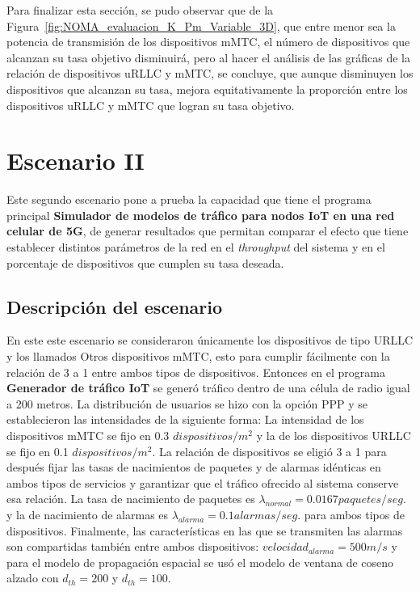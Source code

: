 Para finalizar esta sección, se pudo observar que de la Figura~\ref{fig:NOMA_evaluacion_K_Pm_Variable_3D}, que entre menor sea la potencia de transmisión de los dispositivos mMTC, el número de dispositivos que alcanzan su tasa objetivo disminuirá, pero al hacer el análisis de las gráficas de la relación de dispositivos uRLLC y mMTC, se concluye, que aunque disminuyen los dispositivos que alcanzan su tasa, mejora equitativamente la proporción entre los dispositivos uRLLC y mMTC que logran su tasa objetivo.

\break

\section{Escenario II} %

Este segundo escenario pone a prueba la capacidad que tiene el programa principal \textbf{Simulador de modelos de tráfico para nodos IoT en una red celular de 5G}, de generar resultados que permitan comparar el efecto que tiene establecer distintos parámetros de la red en el \textit{throughput} del sistema y en el porcentaje de dispositivos que cumplen su tasa deseada. \newline

\subsection{Descripción del escenario}

En este este escenario se consideraron únicamente los dispositivos de tipo URLLC y los llamados Otros dispositivos mMTC, esto para cumplir fácilmente con la relación de 3 a 1 entre ambos tipos de dispositivos. Entonces en el programa \textbf{Generador de tráfico IoT} se generó tráfico dentro de una célula de radio igual a 200 metros. La distribución de usuarios se hizo con la opción PPP y se establecieron las intensidades de la siguiente forma: La intensidad de los dispositivos mMTC se fijo en 0.3 $dispositivos/m^2$ y la de los dispositivos URLLC se fijo en 0.1 $dispositivos/m^2$. La relación de dispositivos se eligió 3 a 1 para después fijar las tasas de nacimientos de paquetes y de alarmas idénticas en ambos tipos de servicios y garantizar que el tráfico ofrecido al sistema conserve esa relación. La tasa de nacimiento de paquetes es $\lambda_{normal} = 0.0167 paquetes/seg.$ y la de nacimiento de alarmas es $\lambda_{alarma} = 0.1 alarmas/seg.$ para ambos tipos de dispositivos. Finalmente, las características en las que se transmiten las alarmas son compartidas también entre ambos dispositivos: $velocidad_{alarma} = 500 m/s$ y para el modelo de propagación espacial se usó el modelo de ventana de coseno alzado con $d_{th}=200$ y $d_{th}=100$. \newline

